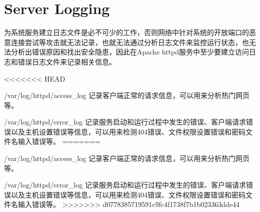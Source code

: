 \begin{lstlisting}[language=bash]

\end{lstlisting}




\begin{lstlisting}[language=bash]

\end{lstlisting}




\begin{lstlisting}[language=bash]

\end{lstlisting}




\begin{lstlisting}[language=bash]

\end{lstlisting}




\begin{lstlisting}[language=bash]

\end{lstlisting}




\begin{lstlisting}[language=bash]

\end{lstlisting}




\section{Server Logging}

为系统服务建立日志文件是必不可少的工作，否则网络中针对系统的开放端口的恶意连接尝试等攻击就无法记录，也就无法通过分析日志文件来监控运行状态，也无法分析出错误原因和找出安全隐患，因此在Apache httpd服务中至少要建立访问日志和错误日志文件来记录相关信息。

\begin{compactitem}
<<<<<<< HEAD
\item /var/log/httpd/access_log 记录客户端正常的请求信息，可以用来分析热门网页等。
\item /var/log/httpd/error_log 记录服务启动和运行过程中发生的错误、客户端请求错误以及主机设置错误等信息，可以用来检测404错误、文件权限设置错误和密码文件名输入错误等。
=======
\item /var/log/httpd/access\_log 记录客户端正常的请求信息，可以用来分析热门网页等。
\item /var/log/httpd/error\_log 记录服务启动和运行过程中发生的错误、客户端请求错误以及主机设置错误等信息，可以用来检测404错误、文件权限设置错误和密码文件名输入错误等。
>>>>>>> d0778385719591c9fc4f1738f7b1b023363dde44
\end{compactitem}

